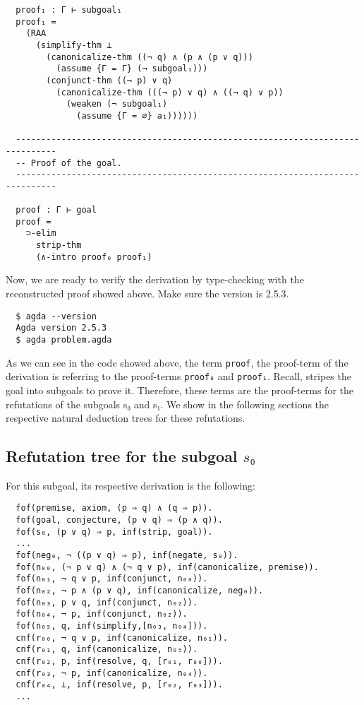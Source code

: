 \documentclass[../main.tex]{subfiles}
\begin{document}
\begin{subappendices}
\begin{verbatim}
  proof₁ : Γ ⊢ subgoal₁
  proof₁ =
    (RAA
      (simplify-thm ⊥
        (canonicalize-thm ((¬ q) ∧ (p ∧ (p ∨ q)))
          (assume {Γ = Γ} (¬ subgoal₁)))
        (conjunct-thm ((¬ p) ∨ q)
          (canonicalize-thm (((¬ p) ∨ q) ∧ ((¬ q) ∨ p))
            (weaken (¬ subgoal₁)
              (assume {Γ = ∅} a₁))))))

  ------------------------------------------------------------------------------
  -- Proof of the goal.
  ------------------------------------------------------------------------------

  proof : Γ ⊢ goal
  proof =
    ⊃-elim
      strip-thm
      (∧-intro proof₀ proof₁)
  \end{verbatim}

Now, we are ready to verify the \Metis derivation by type-checking with
\Agda the reconstructed proof showed above. Make sure the \Agda version is
 2.5.3.

\begin{verbatim}
  $ agda --version
  Agda version 2.5.3
  $ agda problem.agda
\end{verbatim}

As we can see in the \Agda code showed above, the term \verb!proof!,
the proof-term of the \Metis derivation is referring to the
proof-terms \verb!proof₀! and \verb!proof₁!. Recall, \Metis stripes
the goal into subgoals to prove it. Therefore, these terms are the
proof-terms for the refutations of the subgoals s₀ and s₁. We show
in the following sections the respective natural deduction trees for
these refutations.

\subsection{Refutation tree for the subgoal $s₀$}
For this subgoal, its respective \TSTP derivation is
the following:

\begin{verbatim}
  fof(premise, axiom, (p ⇒ q) ∧ (q ⇒ p)).
  fof(goal, conjecture, (p ∨ q) ⇒ (p ∧ q)).
  fof(s₀, (p ∨ q) ⇒ p, inf(strip, goal)).
  ...
  fof(neg₀, ¬ ((p ∨ q) ⇒ p), inf(negate, s₀)).
  fof(n₀₀, (¬ p ∨ q) ∧ (¬ q ∨ p), inf(canonicalize, premise)).
  fof(n₀₁, ¬ q ∨ p, inf(conjunct, n₀₀)).
  fof(n₀₂, ¬ p ∧ (p ∨ q), inf(canonicalize, neg₀)).
  fof(n₀₃, p ∨ q, inf(conjunct, n₀₂)).
  fof(n₀₄, ¬ p, inf(conjunct, n₀₂)).
  fof(n₀₅, q, inf(simplify,[n₀₃, n₀₄])).
  cnf(r₀₀, ¬ q ∨ p, inf(canonicalize, n₀₁)).
  cnf(r₀₁, q, inf(canonicalize, n₀₅)).
  cnf(r₀₂, p, inf(resolve, q, [r₀₁, r₀₀])).
  cnf(r₀₃, ¬ p, inf(canonicalize, n₀₄)).
  cnf(r₀₄, ⊥, inf(resolve, p, [r₀₂, r₀₃])).
  ...
\end{verbatim}


\end{subappendices}
\end{document}
